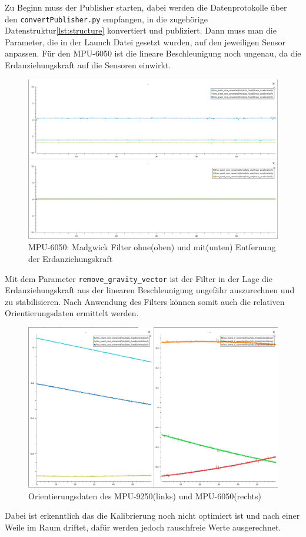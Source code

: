 Zu Beginn muss der Publisher starten, dabei werden die Datenprotokolle über 
\\
den \lstinline{convertPublisher.py} empfangen, in die zugehörige Datenstruktur\ref{lst:structure} konvertiert und publiziert. Dann muss man die Parameter, die in der Launch Datei gesetzt wurden, auf den jeweiligen Sensor anpassen. \newpage
Für den MPU-6050 ist die lineare Beschleunigung noch ungenau, da die Erdanziehungskraft auf die Sensoren einwirkt.

\begin{figure}[h]
	\centering
    \includegraphics[width=1\columnwidth]{Bachelorarbeit/images/RemovalOfGravity.png}
    \caption{MPU-6050: Madgwick Filter ohne(oben) und mit(unten) Entfernung der Erdanziehungskraft}
    \label{fig:RemovalOfGravity}
\end{figure}
Mit dem Parameter \lstinline{remove_gravity_vector} ist der Filter in der Lage die Erdanziehungskraft aus der linearen Beschleunigung ungefähr auszurechnen und zu stabilisieren. 
\newpage
Nach Anwendung des Filters können somit auch die relativen Orientierungsdaten ermittelt werden.

\begin{figure}[h]
	\centering
    \includegraphics[width=1\columnwidth]{Bachelorarbeit/images/6050-Orientierung.png}
    \caption{Orientierungsdaten des MPU-9250(links) und MPU-6050(rechts)}
    \label{fig:Orientation6050}
\end{figure}
Dabei ist erkenntlich das die Kalibrierung noch nicht optimiert ist und nach einer Weile im Raum driftet, dafür werden jedoch rauschfreie Werte ausgerechnet. 

